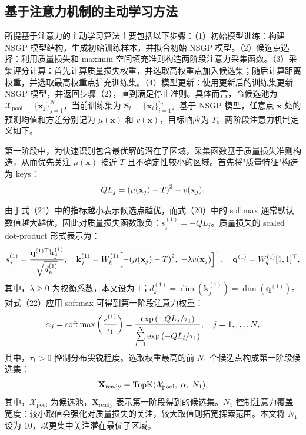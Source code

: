 \documentclass[]{interact}
\theoremstyle{plain}%
\theoremstyle{definition}
\theoremstyle{remark}
\begin{document}
\subsection{基于注意力机制的主动学习方法}
所提基于注意力的主动学习算法主要包括以下步骤：（1）初始模型训练：构建 NSGP 模型结构，生成初始训练样本，并拟合初始 NSGP 模型。（2）候选点选择：利用质量损失和 maximin 空间填充准则构造两阶段注意力采集函数。（3）采集评分计算：首先计算质量损失权重，并选取高权重点加入候选集；随后计算距离权重，并选取最高权重点扩充训练集。（4）模型更新：使用更新后的训练集更新 NSGP 模型，并返回步骤（2），直到满足停止准则。具体而言，令候选池为 $\mathcal{X}_{\mathrm{pool}} = \{\mathbf{x}_{j}\}_{j=1}^{N}$，当前训练集为 $\mathbf{S}_{t} = \{\mathbf{x}_{i}\}_{i=1}^{n_{t}}$。基于 NSGP 模型，任意点 $\mathbf{x}$ 处的预测均值和方差分别记为 $\mu(\mathbf{x})$ 和 $v(\mathbf{x})$，目标响应为 $T$。两阶段注意力机制定义如下。

第一阶段中，为快速识别包含最优解的潜在子区域，采集函数基于质量损失准则构造，从而优先关注 $\mu(\mathbf{x})$ 接近 $T$ 且不确定性较小的区域。首先将"质量特征"构造为 keys：
\begin{equation}
	Q{L_j} = {\left( {\mu ({{\bf{x}}_j}) - T} \right)^2} + v({{\bf{x}}_j}).
\end{equation}

由于式（21）中的指标越小表示候选点越优，而式（20）中的 softmax 通常默认数值越大越优，因此对质量损失函数取负：$s_{j}^{(1)} = -QL_{j}$。质量损失的 scaled dot-product 形式表示为：
\begin{equation}
	s_j^{(1)} = \frac{{{{\bf{q}}^{(1) \top }}{\bf{k}}_j^{(1)}}}{{\sqrt {d_k^{(1)}} }},\quad {\bf{k}}_j^{(1)} = W_k^{(1)}{\left[ { - {{\left( {\mu ({{\bf{x}}_j}) - T} \right)}^2},\; - \lambda v({{\bf{x}}_j})} \right]^ \top },\quad {{\bf{q}}^{(1)}} = W_q^{(1)}{[1,1]^ \top },
\end{equation}
其中，$\lambda \ge 0$ 为权衡系数，本文设为 $1$；$d_{k}^{(1)} = \dim(\mathbf{k}_{j}^{(1)}) = \dim(\mathbf{q}^{(1)})$。对式（22）应用 softmax 可得到第一阶段注意力权重：
\begin{equation}
	{\alpha _j} = {\rm{soft}}\max \left( {\frac{{{s^{(1)}}}}{{{\tau _1}}}} \right) = \frac{{\exp \left( { - Q{L_j}/{\tau _1}} \right)}}{{\sum\limits_{l = 1}^N {\exp } \left( { - Q{L_l}/{\tau _1}} \right)}},\quad j = 1, \ldots ,N,
\end{equation}
其中，$\tau_{1} > 0$ 控制分布尖锐程度。选取权重最高的前 $N_{1}$ 个候选点构成第一阶段候选集：
\begin{equation}
	{{\bf{X}}_{{\rm{ready}}}} = {\rm{TopK}}({{\cal X}_{{\rm{pool}}}},\;\alpha ,\;{N_1}),
\end{equation}
其中，$\mathcal{X}_{\mathrm{pool}}$ 为候选池，$\mathbf{X}_{\mathrm{ready}}$ 表示第一阶段得到的候选集。$N_{1}$ 控制注意力覆盖宽度：较小取值会强化对质量损失的关注，较大取值则拓宽探索范围。本文将 $N_{1}$ 设为 $10$，以更集中关注潜在最优子区域。
\end{document}

